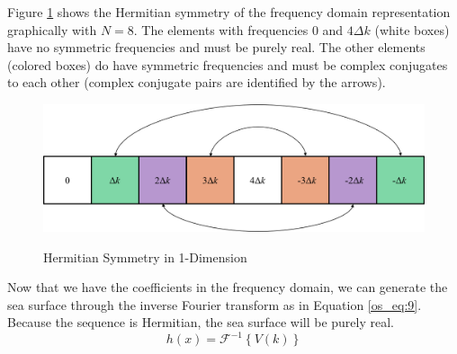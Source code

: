 Figure \ref{os_fig:6ab} shows the Hermitian symmetry of the frequency domain representation graphically with $N = 8$. The elements with frequencies $0$ and $4\Delta k$ (white boxes) have no symmetric frequencies and must be purely real. The other elements (colored boxes) do have symmetric frequencies and must be complex conjugates to each other (complex conjugate pairs are identified by the arrows).
\begin{figure}[H]
  \begin{center}
\includegraphics[width=5in]{../media/Ocean_Surface/1-d_hermitian_symmetry.png}
  \end{center}
  \renewcommand{\baselinestretch}{1} \small\normalsize
  \begin{quote}
    \caption[Hermitian Symmetry in 1-Dimension]{Hermitian Symmetry in 1-Dimension\label{os_fig:6ab}}
  \end{quote}
\end{figure}
\renewcommand{\baselinestretch}{2} \small\normalsize
Now that we have the coefficients in the frequency domain, we can generate the sea surface through the inverse Fourier transform as in Equation \ref{os_eq:9}. Because the sequence is Hermitian, the sea surface will be purely real.
\begin{equation}
  \label{os_eq:9}
  h(x) = \mathcal{F}^{-1}\left\{V(k) \right\}
  \end{equation}

